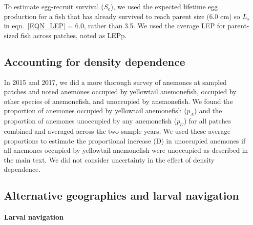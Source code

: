 \documentclass[12pt, oneside]{article}   	%
\begin{document}
To estimate egg-recruit survival ($S_e$), we used the expected lifetime egg production for a fish that has already survived to reach parent size (6.0 cm) so $L_s$ in eqn.\ \ref{EQN_LEP} = 6.0, rather than 3.5. We used the average LEP for parent-sized fish across patches, noted as LEPp.



\subsection{Accounting for density dependence} \label{APP_SEC_METHODS_DD}

In 2015 and 2017, we did a more thorough survey of anemones at sampled patches and noted anemones occupied by yellowtail anemonefish, occupied by other species of anemonefish, and unoccupied by anemonefish. We found the proportion of anemones occupied by yellowtail anemonefish ($p_A$) and the proportion of anemones unoccupied by any anemonefish ($p_U$) for all patches combined and averaged across the two sample years. We used these average proportions to estimate the proportional increase (D) in unoccupied anemones if all anemones occupied by yellowtail anemonefish were unoccupied as described in the main text. We did not consider uncertainty in the effect of density dependence.

\subsection{Alternative geographies and larval navigation} \label{APP_SEC_METHODS_Larval_nav}

\paragraph*{Larval navigation} %
\end{document}
